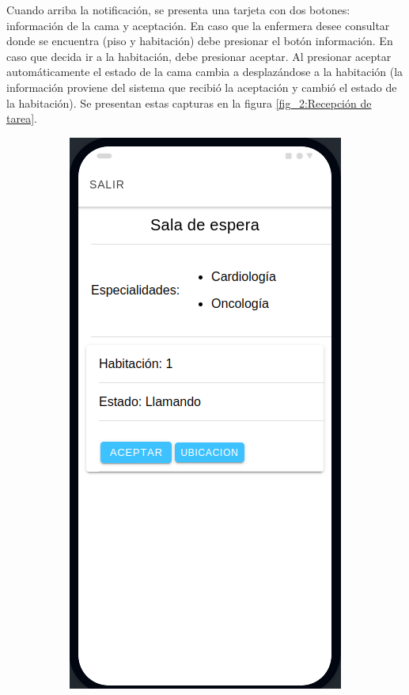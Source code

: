 Cuando arriba la notificación, se presenta una tarjeta con dos botones: información de la cama y aceptación. En caso que la enfermera desee consultar donde se encuentra (piso y habitación) debe presionar el botón información. En caso que decida ir a la habitación, debe presionar aceptar.
Al presionar aceptar automáticamente el estado de la cama cambia a desplazándose a la habitación (la información proviene del sistema que recibió la aceptación y cambió el estado de la habitación). Se presentan estas capturas en la figura \ref{fig_2:Recepción de tarea}.

\begin{figure}[!htpb]
     \centering
     \begin{subfigure}[b]{0.3\textwidth}
         \centering
         \includegraphics[width=.95\textwidth]{./Figures/app/enfermera-peticion.png}

\end{subfigure}
\end{figure}
